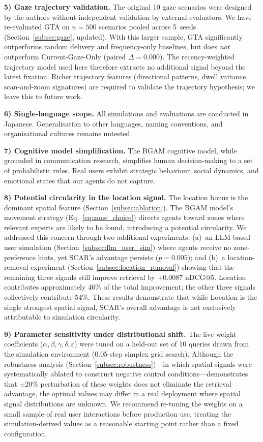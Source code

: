 \documentclass[journal]{IEEEtran}
\begin{document}
\textbf{5) Gaze trajectory validation.}
The original 10 gaze scenarios were designed by the authors without independent validation by external evaluators. We have re-evaluated GTA on $n{=}500$ scenarios pooled across 5~seeds (Section~\ref{subsec:gaze}, updated). With this larger sample, GTA significantly outperforms random delivery and frequency-only baselines, but does \emph{not} outperform Current-Gaze-Only (paired $\Delta = 0.000$). The recency-weighted trajectory model used here therefore extracts no additional signal beyond the latest fixation. Richer trajectory features (directional patterns, dwell variance, scan-and-zoom signatures) are required to validate the trajectory hypothesis; we leave this to future work.

\textbf{6) Single-language scope.}
All simulations and evaluations are conducted in Japanese. Generalisation to other languages, naming conventions, and organisational cultures remains untested.

\textbf{7) Cognitive model simplification.}
The BGAM cognitive model, while grounded in communication research, simplifies human decision-making to a set of probabilistic rules. Real users exhibit strategic behaviour, social dynamics, and emotional states that our agents do not capture.

\textbf{8) Potential circularity in the location signal.}
The location bonus is the dominant spatial feature (Section~\ref{subsec:ablation}). The BGAM model's movement strategy (Eq.~\ref{eq:zone_choice}) directs agents toward zones where relevant experts are likely to be found, introducing a potential circularity. We addressed this concern through two additional experiments: (a)~an LLM-based user simulation (Section~\ref{subsec:llm_user_sim}) where agents receive no zone-preference hints, yet SCAR's advantage persists ($p = 0.005$); and (b)~a location-removal experiment (Section~\ref{subsec:location_removal}) showing that the remaining three signals still improve retrieval by $+0.0087$ nDCG@5. Location contributes approximately 46\% of the total improvement; the other three signals collectively contribute 54\%. These results demonstrate that while Location is the single strongest spatial signal, SCAR's overall advantage is not exclusively attributable to simulation circularity.

\textbf{9) Parameter sensitivity under distributional shift.}
The five weight coefficients ($\alpha, \beta, \gamma, \delta, \varepsilon$) were tuned on a held-out set of 10 queries drawn from the simulation environment (0.05-step simplex grid search). Although the robustness analysis (Section~\ref{subsec:robustness})---in which spatial signals were systematically ablated to construct negative control conditions---demonstrates that $\pm 20\%$ perturbation of these weights does not eliminate the retrieval advantage, the optimal values may differ in a real deployment where spatial signal distributions are unknown. We recommend re-tuning the weights on a small sample of real user interactions before production use, treating the simulation-derived values as a reasonable starting point rather than a fixed configuration.
\end{document}
